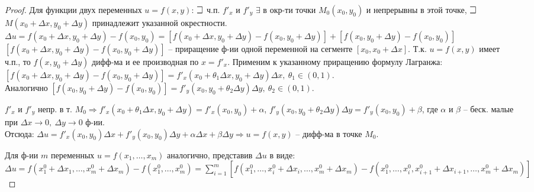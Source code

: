 \begin{proof}
Для функции двух переменных $u=f(x,y)$: $\mathLet$ ч.п. $f'_x$ и $f'_y$ $ \exists$ в окр-ти точки $M_0(x_0,y_0)$ и непрерывны в этой точке, $\mathLet$ $M(x_0+\Delta x, y_0 + \Delta y)$ принадлежит указанной окрестности. \\
$\Delta u=f(x_0+\Delta x, y_0+\Delta y) - f(x_0, y_0) = [f(x_0+\Delta x, y_0+\Delta y)-f(x_0, y_0+\Delta y)] + [f(x_0, y_0+\Delta y) - f(x_0, y_0)]$ \\
$[f(x_0+\Delta x, y_0+\Delta y)-f(x_0, y_0+\Delta y)]$ -- приращение ф-ии одной переменной на сегменте $[x_0, x_0+\Delta x]$. Т.к. $u = f(x,y)$ имеет ч.п., то $f(x, y_0+\Delta y)$ дифф-ма и ее производная по $x = f'_x$. Применим к указанному приращению формулу Лагранжа: \\
$[f(x_0+\Delta x, y_0+\Delta y)-f(x_0, y_0+\Delta y)] = f'_x(x_0+\theta_1\Delta x, y_0+\Delta y)\Delta x, ~ \theta_1 \in (0,1)$.\\
Аналогично 
$[f(x_0, y_0+\Delta y)-f(x_0, y_0)] = f'_y(x_0, y_0+\theta_2\Delta y)\Delta y, ~ \theta_2 \in (0,1)$.

$f'_x$ и $f'_y$ непр. в т. $M_0 \Rightarrow f'_x(x_0+\theta_1\Delta x, y_0+\Delta y)=f'_x(x_0,y_0) + \alpha$, $f'_y(x_0, y_0+\theta_2\Delta y)\Delta y=f'_y(x_0,y_0) + \beta$, где $\alpha$ и $\beta$ -- беск. малые при $\Delta x \to 0, ~ \Delta y \to 0$ ф-ии. \\
Отсюда: $\Delta u=f'_x(x_0,y_0)\Delta x + f'_y(x_0,y_0)\Delta y + \alpha\Delta x + \beta\Delta y \Rightarrow u = f(x,y)$ -- дифф-ма в точке $M_0$.

Для ф-ии $m$ переменных $u=f(x_1, \dots, x_m)$ аналогично, представив $\Delta u$  в виде: \\
$\Delta u = f(x^0_1+\Delta x_1, \dots, x^0_m+\Delta x_m) - f(x^0_1, \dots, x^0_m) = \sum_{i=1}^{m}[f(x^0_1, \dots, x^0_i+\Delta x_i, \dots, x^0_m+\Delta x_m) - f(x^0_1, \dots, x^0_i, x^0_{i+1}+\Delta x_{i+1}, \dots, x^0_m+\Delta x_m)]$
\end{proof}





